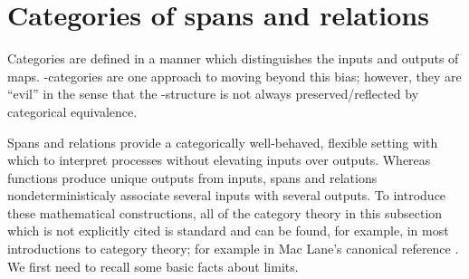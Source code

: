 
\section{Categories of spans and relations}
\label{subsec:spanrel}
Categories are defined in a manner which distinguishes the inputs and outputs of maps.  \dag-categories are one approach to moving beyond this bias; however, they are ``evil'' in the sense that the \dag-structure is not always preserved/reflected by categorical equivalence.

Spans and relations provide a categorically well-behaved, flexible setting with which to interpret processes without elevating inputs over outputs.
Whereas functions produce unique outputs from inputs, spans and relations nondeterministicaly associate several inputs with several outputs.  To introduce these mathematical constructions, all of the category theory in this subsection which is not explicitly cited is standard and can be found, for example, in most introductions to category theory; for example in Mac Lane's canonical reference \cite{maclane}.
We first need to recall some basic facts about limits.
